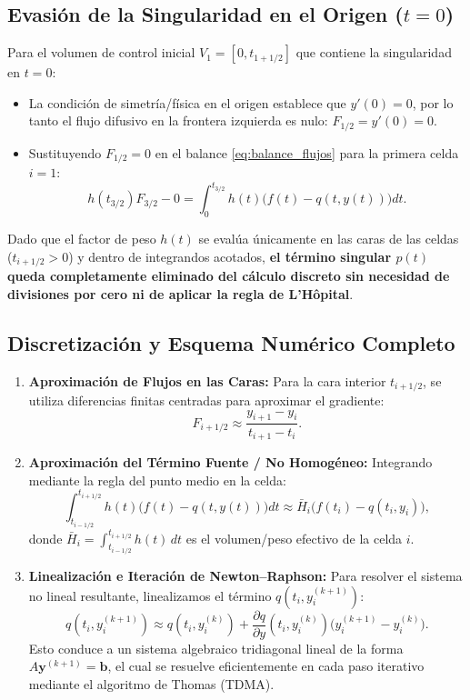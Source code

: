 \documentclass[12pt,a4paper]{article}
\begin{document}
\subsection{Evasión de la Singularidad en el Origen ($t = 0$)}
Para el volumen de control inicial $V_1 = [0, t_{1+1/2}]$ que contiene la singularidad en $t = 0$:
\begin{itemize}
    \item La condición de simetría/física en el origen establece que $y'(0) = 0$, por lo tanto el flujo difusivo en la frontera izquierda es nulo: $F_{1/2} = y'(0) = 0$.
    \item Sustituyendo $F_{1/2} = 0$ en el balance \eqref{eq:balance_flujos} para la primera celda $i=1$:
    \[
    h(t_{3/2}) F_{3/2} - 0 = \int_0^{t_{3/2}} h(t) \Big( f(t) - q(t, y(t)) \Big) dt.
    \]
\end{itemize}
Dado que el factor de peso $h(t)$ se evalúa únicamente en las caras de las celdas ($t_{i+1/2} > 0$) y dentro de integrandos acotados, \textbf{el término singular $p(t)$ queda completamente eliminado del cálculo discreto sin necesidad de divisiones por cero ni de aplicar la regla de L'H\^{o}pital}.

\subsection{Discretización y Esquema Numérico Completo}
\begin{enumerate}
    \item \textbf{Aproximación de Flujos en las Caras:}
    Para la cara interior $t_{i+1/2}$, se utiliza diferencias finitas centradas para aproximar el gradiente:
    \[
    F_{i+1/2} \approx \frac{y_{i+1} - y_i}{t_{i+1} - t_i}.
    \]

    \item \textbf{Aproximación del Término Fuente / No Homogéneo:}
    Integrando mediante la regla del punto medio en la celda:
    \[
    \int_{t_{i-1/2}}^{t_{i+1/2}} h(t) \Big( f(t) - q(t, y(t)) \Big) dt \approx \bar{H}_i \Big( f(t_i) - q(t_i, y_i) \Big),
    \]
    donde $\bar{H}_i = \int_{t_{i-1/2}}^{t_{i+1/2}} h(t) \, dt$ es el volumen/peso efectivo de la celda $i$.

    \item \textbf{Linealización e Iteración de Newton--Raphson:}
    Para resolver el sistema no lineal resultante, linealizamos el término $q(t_i, y_i^{(k+1)})$:
    \[
    q(t_i, y_i^{(k+1)}) \approx q(t_i, y_i^{(k)}) + \frac{\partial q}{\partial y}(t_i, y_i^{(k)}) \big( y_i^{(k+1)} - y_i^{(k)} \big).
    \]
    Esto conduce a un sistema algebraico tridiagonal lineal de la forma $A \mathbf{y}^{(k+1)} = \mathbf{b}$, el cual se resuelve eficientemente en cada paso iterativo mediante el algoritmo de Thomas (TDMA).
\end{enumerate}
\end{document}
